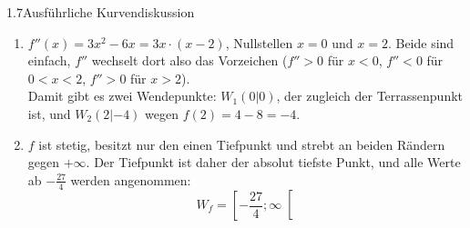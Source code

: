 \begin{loesung}{1.7}{Ausführliche Kurvendiskussion}
\begin{enumerate}[label=\alph*)]
  \item $f''(x) = 3x^2-6x = 3x\cdot(x-2)$, Nullstellen $x=0$ und $x=2$. Beide sind einfach, $f''$ wechselt dort also das Vorzeichen ($f''>0$ für $x<0$, $f''<0$ für $0<x<2$, $f''>0$ für $x>2$).\\
  Damit gibt es zwei Wendepunkte: $W_1(0|0)$, der zugleich der Terrassenpunkt ist, und $W_2(2|-4)$ wegen $f(2) = 4-8 = -4$.
  \item $f$ ist stetig, besitzt nur den einen Tiefpunkt und strebt an beiden Rändern gegen $+\infty$. Der Tiefpunkt ist daher der absolut tiefste Punkt, und alle Werte ab $-\frac{27}{4}$ werden angenommen:
  \[W_f = \left[-\dfrac{27}{4};\infty\right[\]
  \begin{center}
  \end{center}
\end{enumerate}
\end{loesung}

